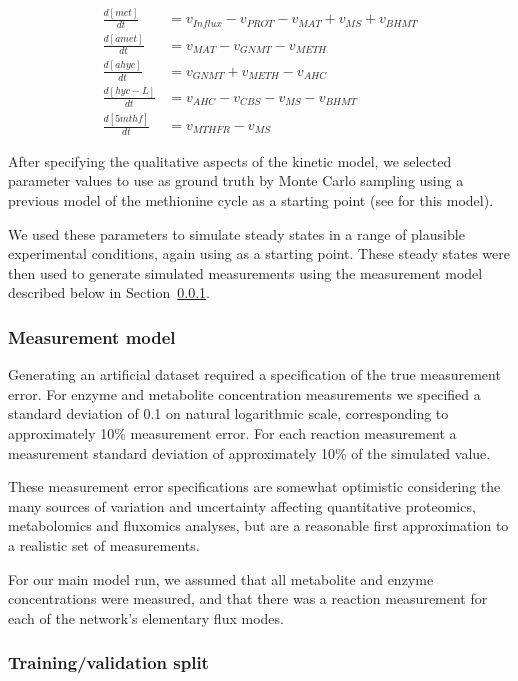 \documentclass[journal=,manuscript=]{achemso}
\begin{document}
\begin{align}
\frac{d[met]}{dt} &= v_{Influx} - v_{PROT} - v_{MAT} +v_{MS} + v_{BHMT} \label{eq-meth-ode} \\
\frac{d[amet]}{dt} &= v_{MAT} - v_{GNMT} - v_{METH} \nonumber \\
\frac{d[ahyc]}{dt} &= v_{GNMT} + v_{METH} - v_{AHC} \nonumber \\
\frac{d[hyc-L]}{dt} &= v_{AHC} - v_{CBS} - v_{MS} - v_{BHMT} \nonumber \\
\frac{d[5mthf]}{dt} &= v_{MTHFR} - v_{MS} \nonumber 
\end{align}

After specifying the qualitative aspects of the kinetic model, we
selected parameter values to use as ground truth by Monte Carlo sampling
using a previous model of the methionine cycle as a starting point (see
\citet{saa_general_2015} for this model).

We used these parameters to simulate steady states in a range of
plausible experimental conditions, again using \citet{saa_general_2015}
as a starting point. These steady states were then used to generate
simulated measurements using the measurement model described below in
Section~\ref{sec-methionine-measurement-model}.

\hypertarget{sec-methionine-measurement-model}{%
\subsubsection{Measurement
model}\label{sec-methionine-measurement-model}}

Generating an artificial dataset required a specification of the true
measurement error. For enzyme and metabolite concentration measurements
we specified a standard deviation of 0.1 on natural logarithmic scale,
corresponding to approximately 10\% measurement error. For each reaction
measurement a measurement standard deviation of approximately 10\% of
the simulated value.

These measurement error specifications are somewhat optimistic
considering the many sources of variation and uncertainty affecting
quantitative proteomics, metabolomics and fluxomics analyses, but are a
reasonable first approximation to a realistic set of measurements.

For our main model run, we assumed that all metabolite and enzyme
concentrations were measured, and that there was a reaction measurement
for each of the network's elementary flux modes.

\hypertarget{trainingvalidation-split}{%
\subsubsection{Training/validation
split}\label{trainingvalidation-split}}
\end{document}
